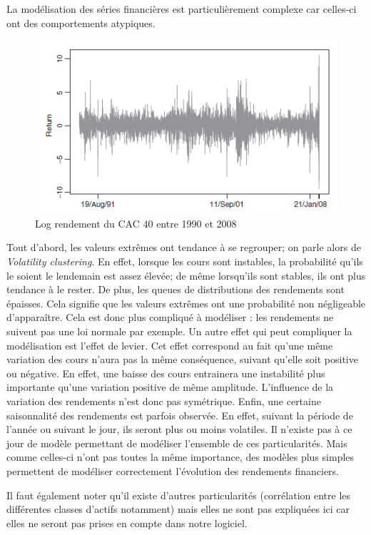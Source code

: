 		La modélisation des séries financières est particulièrement complexe car celles-ci ont des comportements atypiques.
		\nocite{francq2010garch}

		\begin{figure}[h]
			\center
			\includegraphics{logRendementCAC40.png}
			\caption{Log rendement du CAC 40 entre 1990 et 2008}
			\label{log_rendement}
		\end{figure}

		Tout d'abord, les valeurs extrêmes ont tendance à se regrouper; on parle alors de \textit{Volatility clustering}. En effet, lorsque les cours sont instables, la probabilité qu'ils le soient le lendemain est assez élevée; de même lorsqu'ils sont stables, ils ont plus tendance à le rester.
		De plus, les queues de distributions des rendements sont épaisses. Cela signifie que les valeurs extrêmes ont une probabilité non négligeable d'apparaître. Cela est donc plus compliqué à modéliser : les rendements ne suivent pas une loi normale par exemple.
		Un autre effet qui peut compliquer la modélisation est l'effet de levier. Cet effet correspond au fait qu'une même variation des cours n'aura pas la même conséquence, suivant qu'elle soit positive ou négative. En effet, une baisse des cours entrainera une instabilité plus importante qu'une variation positive de même amplitude. L'influence de la variation des rendements n'est donc pas symétrique.
		Enfin, une certaine saisonnalité des rendements est parfois observée. En effet, suivant la période de l'année ou suivant le jour, ils seront plus ou moins volatiles.
		Il n'existe pas à ce jour de modèle permettant de modéliser l'ensemble de ces particularités. Mais comme celles-ci n'ont pas toutes la même importance, des modèles plus simples permettent de modéliser correctement l'évolution des rendements financiers.
		
		Il faut également noter qu'il existe d'autres particularités (corrélation entre les différentes classes d'actifs notamment) mais elles ne sont pas expliquées ici car elles ne seront pas prises en compte dans notre logiciel.


